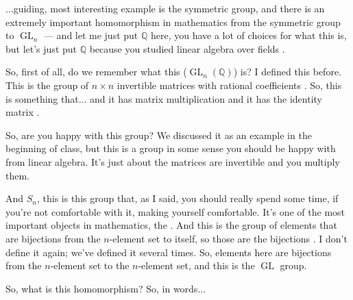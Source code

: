 \begin{speech}[00:06:20 - 00:08:02]
...guiding, most interesting example is the symmetric group, and there is an extremely important homomorphism in mathematics from the symmetric group to $\operatorname{GL}_n$ --- and let me just put $\mathbb{Q}$ here, you have a lot of choices for what this is, but let's just put $\mathbb{Q}$ because you studied linear algebra over fields .

So, first of all, do we remember what this ($\operatorname{GL}_n(\mathbb{Q})$) is? I defined this before. This is the group of $n \times n$ invertible matrices with rational coefficients . So, this is something that... and it has matrix multiplication and it has the identity matrix .

So, are you happy with this group? We discussed it as an example in the beginning of class, but this is a group in some sense you should be happy with from linear algebra. It's just about the matrices are invertible and you multiply them.

And $S_n$, this is this group that, as I said, you should really spend some time, if you're not comfortable with it, making yourself comfortable. It's one of the most important objects in mathematics, the . And this is the group of elements that are bijections from the $n$-element set to itself, so those are the bijections . I don't define it again; we've defined it several times. So, elements here are bijections from the $n$-element set to the $n$-element set, and this is the $\operatorname{GL}$ group.

So, what is this homomorphism? So, in words...
\end{speech}


